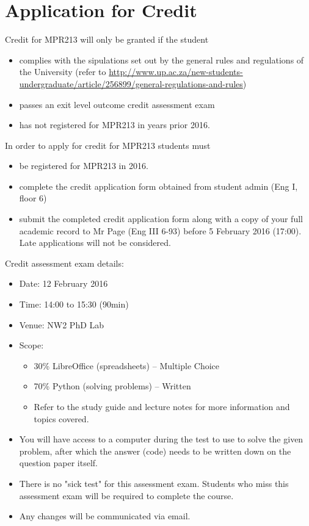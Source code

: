 \newpage
\section{Application for Credit} \label{sec:credit_study_guide}
    \noindent
    Credit for MPR213 will only be granted if the student
    \begin{itemize}
        \item complies with the sipulations set out by the general rules and
            regulations of the University (refer to
            \url{http://www.up.ac.za/new-students-undergraduate/article/256899/general-regulations-and-rules})
        \item passes an exit level outcome credit assessment exam
        \item has not registered for MPR213 in years prior 2016.
    \end{itemize}

    \noindent
    In order to apply for credit for MPR213 students must
    \begin{itemize}
        \item be registered for MPR213 in 2016.
        \item complete the credit application form obtained from student
            admin (Eng I, floor 6)
        \item submit the completed credit application form along with a
            copy of your full academic record to Mr Page (Eng III 6-93) before
            5 February 2016 (17:00). Late applications will not be considered.
    \end{itemize}

    \noindent
    Credit assessment exam details:
    \begin{itemize}
        \item Date: 12 February 2016
        \item Time: 14:00 to 15:30 (90min)
        \item Venue: NW2 PhD Lab
        \item Scope:
        \begin{itemize}
            \item 30\% LibreOffice (spreadsheets) -- Multiple Choice
            \item 70\% Python (solving problems) -- Written
            \item Refer to the study guide and lecture notes for more
                information and topics covered.
        \end{itemize}
        \item You will have access to a computer during the test to use to
            solve the given problem, after which the answer (code) needs to be
            written down on the question paper itself.
        \item There is no "sick test" for this assessment exam. Students who
            miss this assessment exam will be required to complete the course.
        \item Any changes will be communicated via email.
    \end{itemize}

